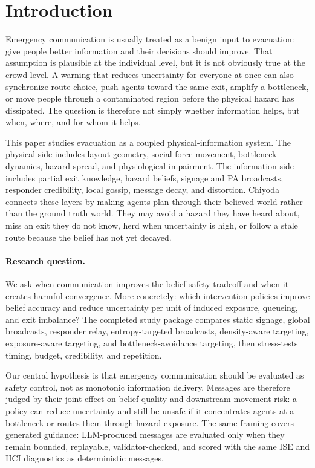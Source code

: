 \section{Introduction}
\label{sec:intro}

Emergency communication is usually treated as a benign input to evacuation:
give people better information and their decisions should improve. That
assumption is plausible at the individual level, but it is not obviously true
at the crowd level. A warning that reduces uncertainty for everyone at once can
also synchronize route choice, push agents toward the same exit, amplify a
bottleneck, or move people through a contaminated region before the physical
hazard has dissipated. The question is therefore not simply whether information
helps, but when, where, and for whom it helps.

This paper studies evacuation as a coupled physical-information system. The
physical side includes layout geometry, social-force movement, bottleneck
dynamics, hazard spread, and physiological impairment. The information side
includes partial exit knowledge, hazard beliefs, signage and PA broadcasts,
responder credibility, local gossip, message decay, and distortion. Chiyoda
connects these layers by making agents plan through their believed world rather
than the ground truth world. They may avoid a hazard they have heard about,
miss an exit they do not know, herd when uncertainty is high, or follow a
stale route because the belief has not yet decayed.

\paragraph{Research question.} We ask when communication improves the
belief-safety tradeoff and when it creates harmful convergence. More
concretely: which intervention policies improve belief accuracy and reduce
uncertainty per unit of induced exposure, queueing, and exit imbalance? The
completed study package compares static signage, global broadcasts, responder
relay, entropy-targeted broadcasts, density-aware targeting, exposure-aware
targeting, and bottleneck-avoidance targeting, then stress-tests timing,
budget, credibility, and repetition.

Our central hypothesis is that emergency communication should be evaluated as
safety control, not as monotonic information delivery. Messages are therefore
judged by their joint effect on belief quality and downstream movement risk: a
policy can reduce uncertainty and still be unsafe if it concentrates agents at
a bottleneck or routes them through hazard exposure. The same framing covers
generated guidance: LLM-produced messages are evaluated only when they remain
bounded, replayable, validator-checked, and scored with the same ISE and HCI
diagnostics as deterministic messages.

